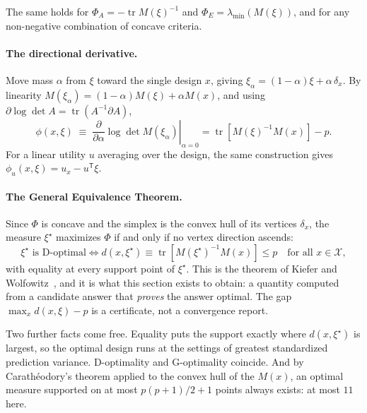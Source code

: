 \documentclass[10pt]{article}
\begin{document}
The same holds for $\Phi_A = -\operatorname{tr}M(\xi)^{-1}$ and $\Phi_E =
\lambda_{\min}(M(\xi))$, and for any non-negative combination of concave criteria.

\paragraph{The directional derivative.}
Move mass $\alpha$ from $\xi$ toward the single design $x$, giving
$\xi_\alpha = (1-\alpha)\xi + \alpha\,\delta_x$. By linearity
$M(\xi_\alpha) = (1-\alpha)M(\xi) + \alpha M(x)$, and using
$\partial \log\det A = \operatorname{tr}(A^{-1}\partial A)$,
%
\begin{equation}
\phi(x,\xi) \;\equiv\; \left.\frac{\partial}{\partial\alpha}\log\det M(\xi_\alpha)\right|_{\alpha=0}
= \operatorname{tr}\!\left[M(\xi)^{-1}M(x)\right] - p .
\label{eq:directional}
\end{equation}
%
For a linear utility $u$ averaging over the design, the same construction gives
$\phi_u(x,\xi) = u_x - u^{\mathsf T}\xi$.

\paragraph{The General Equivalence Theorem.}
Since $\Phi$ is concave and the simplex is the convex hull of its vertices $\delta_x$, the
measure $\xi^\star$ maximizes $\Phi$ if and only if no vertex direction ascends:
%
\begin{equation}
\boxed{\;
\xi^\star \text{ is D-optimal}
\iff
d(x,\xi^\star) \equiv \operatorname{tr}\!\left[M(\xi^\star)^{-1}M(x)\right] \le p
\quad\text{for all } x\in\mathcal{X},
\;}
\label{eq:equivalence}
\end{equation}
%
with equality at every support point of $\xi^\star$. This is the theorem of Kiefer and
Wolfowitz~\citep{kiefer1960equivalence}, and it is what this section exists to obtain: a
quantity computed from a candidate answer that \emph{proves} the answer optimal. The gap
$\max_x d(x,\xi) - p$ is a certificate, not a convergence report.

Two further facts come free. Equality puts the support exactly where $d(x,\xi^\star)$ is
largest, so the optimal design runs at the settings of greatest standardized prediction
variance. D-optimality and G-optimality coincide.
And by Carath\'eodory's theorem applied to the convex hull of the $M(x)$, an optimal measure
supported on at most $p(p+1)/2 + 1$ points always exists: at most $11$ here.
\end{document}

